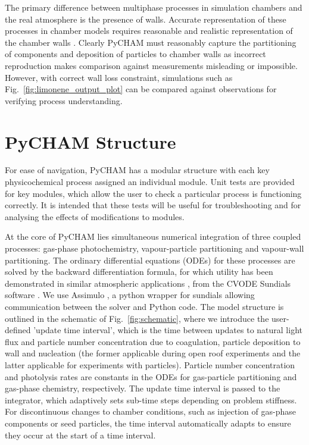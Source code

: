 \documentclass[gmd, manuscript]{copernicus}
\begin{document}
The primary difference between multiphase processes in simulation chambers and the real atmosphere is the presence of walls.  Accurate representation of these processes in chamber models requires reasonable and realistic representation of the chamber walls \citep[e.g][]{Matsunaga2010, Zhang2015b}.  Clearly PyCHAM must reasonably capture the partitioning of components and deposition of particles to chamber walls as incorrect reproduction makes comparison against measurements misleading or impossible.  However, with correct wall loss constraint, simulations such as Fig.~\ref{fig:limonene_output_plot} can be compared against observations for verifying process understanding.

\section{PyCHAM Structure}\label{sec:general}

For ease of navigation, PyCHAM has a modular structure with each key physicochemical process assigned an individual module.  Unit tests are provided for key modules, which allow the user to check a particular process is functioning correctly.  It is intended that these tests will be useful for troubleshooting and for analysing the effects of modifications to modules.
  
At the core of PyCHAM lies simultaneous numerical integration of three coupled processes: gas-phase photochemistry, vapour-particle partitioning and vapour-wall partitioning.  The ordinary differential equations (ODEs) for these processes are solved by the backward differentiation formula, for which utility has been demonstrated in similar atmospheric applications \citep{Jacobson2005}, from the CVODE Sundials software \citep{hindmarsh2005sundials}.  We use Assimulo \citep{Andersson2015}, a python wrapper for sundials allowing communication between the solver and Python code.  The model structure is outlined in the schematic of Fig.~\ref{fig:schematic}, where we introduce the user-defined 'update time interval', which is the time between updates to natural light flux and particle number concentration due to coagulation, particle deposition to wall and nucleation (the former applicable during open roof experiments and the latter applicable for experiments with particles).  Particle number concentration and photolysis rates are constants in the ODEs for gas-particle partitioning and gas-phase chemistry, respectively.  The update time interval is passed to the integrator, which adaptively sets sub-time steps depending on problem stiffness.  For discontinuous changes to chamber conditions, such as injection of gas-phase components or seed particles, the time interval automatically adapts to ensure they occur at the start of a time interval.  
\end{document}
